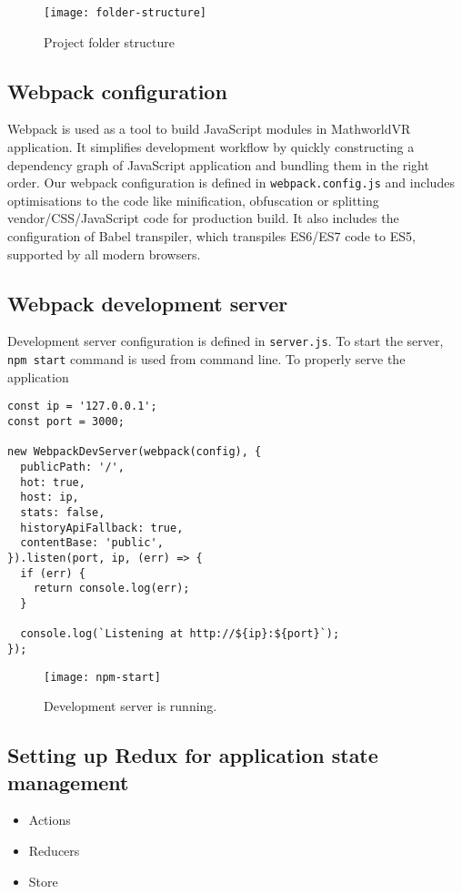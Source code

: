\begin{figure}[ht!]
\centering
\texttt{[image: folder-structure]}
\caption{Project folder structure}
\label{r:62}
\end{figure}


\subsection{Webpack configuration}
Webpack is used as a tool to build JavaScript modules in MathworldVR application. It simplifies development workflow by quickly constructing a dependency graph of JavaScript application and bundling them in the right order. Our webpack configuration is defined in \texttt{webpack.config.js} and includes optimisations to the code like minification, obfuscation or splitting vendor/CSS/JavaScript code for production build. It also includes the configuration of Babel transpiler, which transpiles ES6/ES7 code to ES5, supported by all modern browsers.

\subsection{Webpack development server}
Development server configuration is defined in \texttt{server.js}. To start the server, \texttt{npm start} command is used from command line.  To properly serve the application

\begin{lstlisting}
const ip = '127.0.0.1';
const port = 3000;

new WebpackDevServer(webpack(config), {
  publicPath: '/',
  hot: true,
  host: ip,
  stats: false,
  historyApiFallback: true,
  contentBase: 'public',
}).listen(port, ip, (err) => {
  if (err) {
    return console.log(err);
  }

  console.log(`Listening at http://${ip}:${port}`);
});
\end{lstlisting}

\begin{figure}[ht!]
\centering
\texttt{[image: npm-start]}
\caption{Development server is running.}
\label{r:63}
\end{figure}

\subsection{Setting up Redux for application state management}
\begin{itemize}
\item{Actions}
\item{Reducers}
\item{Store}
\end{itemize}

